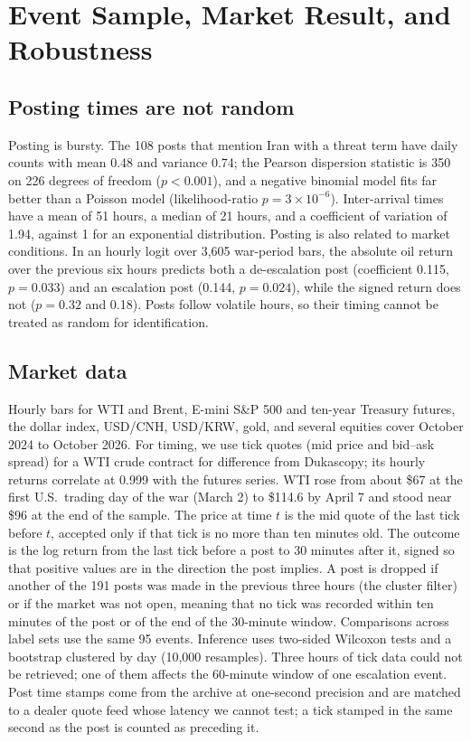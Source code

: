 \documentclass[11pt]{article}
\begin{document}
\section{Event Sample, Market Result, and Robustness}
\label{sec:market}

\subsection{Posting times are not random}

Posting is bursty. The 108 posts that mention Iran with a threat term have daily counts with mean 0.48 and variance 0.74; the Pearson dispersion statistic is 350 on 226 degrees of freedom ($p < 0.001$), and a negative binomial model fits far better than a Poisson model (likelihood-ratio $p = 3 \times 10^{-6}$). Inter-arrival times have a mean of 51 hours, a median of 21 hours, and a coefficient of variation of 1.94, against 1 for an exponential distribution. Posting is also related to market conditions. In an hourly logit over 3,605 war-period bars, the absolute oil return over the previous six hours predicts both a de-escalation post (coefficient 0.115, $p = 0.033$) and an escalation post (0.144, $p = 0.024$), while the signed return does not ($p = 0.32$ and 0.18). Posts follow volatile hours, so their timing cannot be treated as random for identification.

\subsection{Market data}

Hourly bars for WTI and Brent, E-mini S\&P 500 and ten-year Treasury futures, the dollar index, USD/CNH, USD/KRW, gold, and several equities cover October 2024 to October 2026. For timing, we use tick quotes (mid price and bid--ask spread) for a WTI crude contract for difference from Dukascopy; its hourly returns correlate at 0.999 with the futures series. WTI rose from about \$67 at the first U.S.\ trading day of the war (March 2) to \$114.6 by April 7 and stood near \$96 at the end of the sample. The price at time $t$ is the mid quote of the last tick before $t$, accepted only if that tick is no more than ten minutes old. The outcome is the log return from the last tick before a post to 30 minutes after it, signed so that positive values are in the direction the post implies. A post is dropped if another of the 191 posts was made in the previous three hours (the cluster filter) or if the market was not open, meaning that no tick was recorded within ten minutes of the post or of the end of the 30-minute window. Comparisons across label sets use the same 95 events. Inference uses two-sided Wilcoxon tests and a bootstrap clustered by day (10,000 resamples). Three hours of tick data could not be retrieved; one of them affects the 60-minute window of one escalation event. Post time stamps come from the archive at one-second precision and are matched to a dealer quote feed whose latency we cannot test; a tick stamped in the same second as the post is counted as preceding it.
\end{document}
